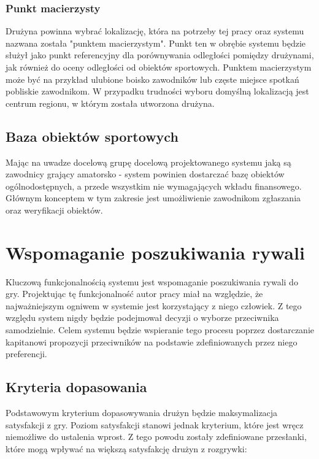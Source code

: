 \subsubsection{Punkt macierzysty}

Drużyna powinna wybrać lokalizację, która na potrzeby tej pracy oraz systemu nazwana została "punktem macierzystym". Punkt ten w obrębie systemu będzie służył jako punkt referencyjny dla porównywania odległości pomiędzy drużynami, jak również do oceny odległości od obiektów sportowych. Punktem macierzystym może być na przykład ulubione boisko zawodników lub częste miejsce spotkań pobliskie zawodnikom. W przypadku trudności wyboru domyślną lokalizacją jest centrum regionu, w którym została utworzona drużyna.

\subsection{Baza obiektów sportowych}

Mając na uwadze docelową grupę docelową projektowanego systemu jaką są zawodnicy grający amatorsko - system powinien dostarczać bazę obiektów ogólnodostępnych, a przede wszystkim nie wymagających wkładu finansowego. Głównym konceptem w tym zakresie jest umożliwienie zawodnikom zgłaszania oraz weryfikacji obiektów. 

\section{Wspomaganie poszukiwania rywali}

Kluczową funkcjonalnością systemu jest wspomaganie poszukiwania rywali do gry. Projektując tę funkcjonalność autor pracy miał na względzie, że najważniejszym ogniwem w systemie jest korzystający z niego człowiek. Z tego względu system nigdy będzie podejmował decyzji o wyborze przeciwnika samodzielnie. Celem systemu będzie wspieranie tego procesu poprzez dostarczanie kapitanowi propozycji przeciwników na podstawie zdefiniowanych przez niego preferencji.


\subsection{Kryteria dopasowania}

Podstawowym kryterium dopasowywania drużyn będzie maksymalizacja satysfakcji z gry. Poziom satysfakcji stanowi jednak kryterium, które jest wręcz niemożliwe do ustalenia wprost. Z tego powodu zostały zdefiniowane przesłanki, które mogą wpływać na większą satysfakcję drużyn z rozgrywki:

